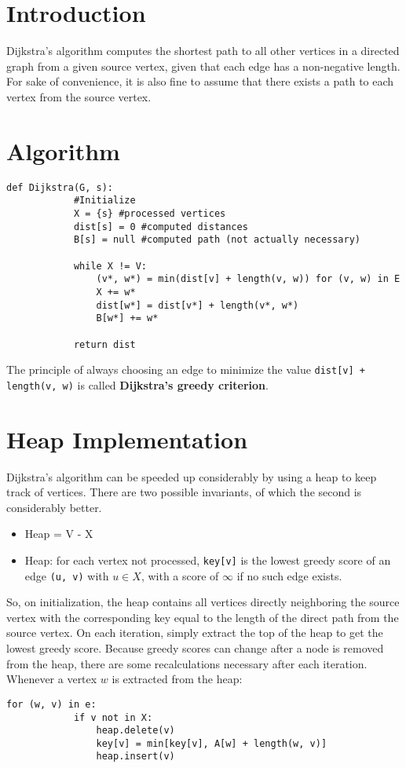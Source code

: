 \documentclass[11pt]{article}
\begin{document}
\section{Introduction}
	Dijkstra's algorithm computes the shortest path to all other vertices in a directed graph from a given source vertex, given that each edge has a non-negative length. For sake of convenience, it is also fine to assume that there exists a path to each vertex from the source vertex.
	
\section{Algorithm}
	\begin{lstlisting}[autogobble=true]
		def Dijkstra(G, s):
			#Initialize
			X = {s}	#processed vertices
			dist[s] = 0	#computed distances
			B[s] = null	#computed path (not actually necessary)

			while X != V:
				(v*, w*) = min(dist[v] + length(v, w)) for (v, w) in E
				X += w*
				dist[w*] = dist[v*] + length(v*, w*)
				B[w*] += w*

			return dist
	\end{lstlisting}

	The principle of always choosing an edge to minimize the value \verb|dist[v] + length(v, w)| is called \textbf{Dijkstra's greedy criterion}. 

\section{Heap Implementation}
	Dijkstra's algorithm can be speeded up considerably by using a heap to keep track of vertices. There are two possible invariants, of which the second is considerably better.
	\begin{itemize}
		\item Heap = V - X
		\item Heap: for each vertex not processed, \verb|key[v]| is the lowest greedy score of an edge \verb|(u, v)| with $u\in X$, with a score of $\infty$ if no such edge exists.
	\end{itemize}
	
	So, on initialization, the heap contains all vertices directly neighboring the source vertex with the corresponding key equal to the length of the direct path from the source vertex. On each iteration, simply extract the top of the heap to get the lowest greedy score. Because greedy scores can change after a node is removed from the heap, there are some recalculations necessary after each iteration. Whenever a vertex $w$ is extracted from the heap:
	\begin{lstlisting}[autogobble]
		for (w, v) in e:
			if v not in X:
				heap.delete(v)
				key[v] = min[key[v], A[w] + length(w, v)]
				heap.insert(v)
	\end{lstlisting}
\end{document}
